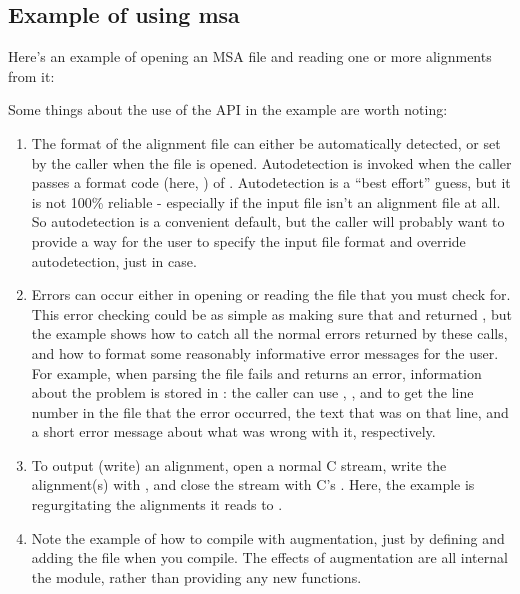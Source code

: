 \subsection{Example of using msa}

Here's an example of opening an MSA file and reading one or more
alignments from it:


Some things about the use of the API in the example are worth noting:

\begin{enumerate}
\item The format of the alignment file can either be automatically
      detected, or set by the caller when the file is opened.
      Autodetection is invoked when the caller passes a format code
      (here, ) of
      . Autodetection is a ``best effort''
      guess, but it is not 100\% reliable - especially if the input
      file isn't an alignment file at all. So autodetection is a
      convenient default, but the caller will probably want to provide
      a way for the user to specify the input file format and override
      autodetection, just in case.

\item Errors can occur either in opening or reading the file that you
      must check for. This error checking could be as simple as making
      sure that  and
       returned , but the example
      shows how to catch all the normal errors returned by these
      calls, and how to format some reasonably informative error
      messages for the user. For example, when parsing the file fails
      and  returns an 
      error, information about the problem is stored in :
      the caller can use , ,
      and  to get the line number in the file that
      the error occurred, the text that was on that line, and a short
      error message about what was wrong with it, respectively.

\item To output (write) an alignment, open a normal C 
      stream, write the alignment(s) with ,
      and close the stream with C's . Here, the
      example is regurgitating the alignments it reads to
      .

\item Note the example of how to compile with 
      augmentation, just by defining  and
      adding the  file when you compile. The
      effects of  augmentation are all internal the
       module, rather than providing any new functions.
\end{enumerate}

